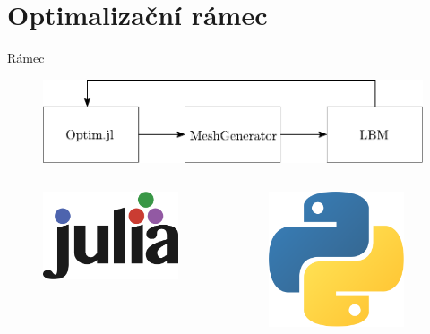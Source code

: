 \documentclass[aspectratio=169,xcolor=dvipsnames]{beamer}
\begin{document}
\section{Optimalizační rámec}
\begin{frame}{Rámec}
	
	\begin{figure}
		\includegraphics[width=0.9\linewidth, trim={0 -0.1cm 0 0}, clip]{Images/pipeline.pdf}
	\end{figure}
	\vspace{-2mm}
	\begin{columns}[T] %
		\begin{column}{.31\textwidth}
			\begin{figure}
				\includegraphics[width=0.5\linewidth, trim={0 0 0 0}, clip]{Images/julia.png}
			\end{figure}
		\end{column}%
		\begin{column}{.31\textwidth}
			\begin{figure}
				\includegraphics[width=0.35\linewidth, trim={0 0 0 0cm}, clip]{Images/python.png}
			\end{figure}
		\end{column}%
		\begin{column}{.31\textwidth}

\end{column}
\end{columns}
\end{frame}
\end{document}
